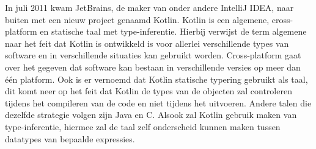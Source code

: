 In juli 2011 kwam JetBrains, de maker van onder andere IntelliJ IDEA, naar buiten met een nieuw project genaamd Kotlin.\autocite{Jemerov2011} Kotlin is een algemene, cross-platform en statische taal met type-inferentie. \autocite{Oliveira2020} Hierbij verwijst de term algemene naar het feit dat Kotlin is ontwikkeld is voor allerlei verschillende types van software en in verschillende situaties kan gebruikt worden. Cross-platform gaat over het gegeven dat software kan bestaan in verschillende versies op meer dan één platform. Ook is er vernoemd dat Kotlin statische typering gebruikt als taal, dit komt neer op het feit dat Kotlin de types van de objecten zal controleren tijdens het compileren van de code en niet tijdens het uitvoeren. Andere talen die dezelfde strategie volgen zijn Java en C. Alsook zal Kotlin gebruik maken van type-inferentie, hiermee zal de taal zelf onderscheid kunnen maken tussen datatypes van bepaalde expressies. 

\section{}
\label{sec:SVZontwikkelingsvormen}


